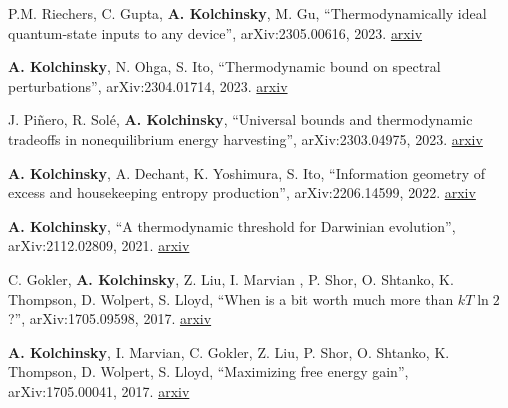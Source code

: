 
P.M. Riechers, C. Gupta, \textbf{A. Kolchinsky}, M. Gu, ``Thermodynamically ideal quantum-state inputs to any device'', arXiv:2305.00616, 2023. \href{http://arxiv.org/abs/2305.00616}{arxiv}

\textbf{A. Kolchinsky}, N. Ohga, S. Ito, ``Thermodynamic bound on spectral perturbations'', arXiv:2304.01714, 2023. \href{http://arxiv.org/abs/2304.01714}{arxiv}

J. Piñero, R. Solé, \textbf{A. Kolchinsky}, ``Universal bounds and thermodynamic tradeoffs in nonequilibrium energy harvesting'', arXiv:2303.04975, 2023. \href{http://arxiv.org/abs/2303.04975}{arxiv}

\textbf{A. Kolchinsky}, A. Dechant, K. Yoshimura, S. Ito, 
``Information geometry of excess and housekeeping entropy production'', arXiv:2206.14599, 2022. \href{https://arxiv.org/abs/2206.14599}{arxiv}

\textbf{A. Kolchinsky}, ``A thermodynamic threshold for Darwinian evolution'', arXiv:2112.02809, 2021. \href{http://arxiv.org/abs/2112.02809}{arxiv} 

C. Gokler, \textbf{A. Kolchinsky}, Z. Liu, I. Marvian , P. Shor, O. Shtanko, K. Thompson, D. Wolpert, S. Lloyd, ``When is a bit worth much more than $kT \ln 2$?'', arXiv:1705.09598, 2017. \href{https://arxiv.org/abs/1705.09598}{arxiv}

\textbf{A. Kolchinsky}, I. Marvian, C. Gokler, Z. Liu, P. Shor, O. Shtanko, K. Thompson, D. Wolpert, S. Lloyd, ``Maximizing free energy gain'', arXiv:1705.00041, 2017. \href{https://arxiv.org/abs/1705.00041}{arxiv}

